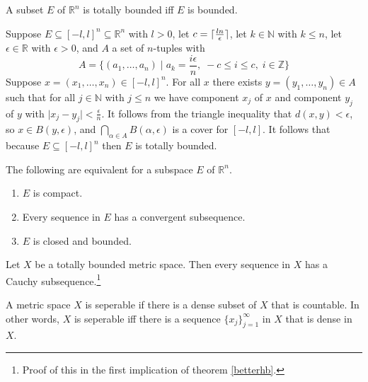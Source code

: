 \documentclass[nobib,notoc]{tufte-handout}
\begin{document}
\begin{lem}
	A subset \(E\) of \(\mathbb{R}^n\) is totally bounded iff \(E\) is bounded.
	\begin{IEEEproof}
	Suppose \(E\subseteq [-l,l]^n\subseteq\mathbb{R}^n\) with \(l>0\), let \(c=\lceil\frac{ln}{\epsilon}\rceil\), let \(k\in\mathbb{N}\) with \(k\leq n\), let \(\epsilon\in\mathbb{R}\) with \(\epsilon>0\), and \(A\) a set of \(n\)-tuples with
	\begin{equation*}
			  A=\{(a_1,\ldots,a_n)\;| \;a_k=\frac{i\epsilon}{n},\; -c\leq i\leq c,\;i\in\mathbb{Z}\}
	\end{equation*}
		Suppose \(x=(x_1,\ldots,x_n)\in[-l,l]^n\). For all \(x\) there exists \(y=(y_1,\ldots,y_n)\in A\) such that for all \(j\in\mathbb{N}\) with \(j\leq n\) we have component \(x_j\) of \(x\) and component \(y_j\) of \(y\) with \(\lvert x_j-y_j\rvert<\frac{\epsilon}{n}\). It follows from the triangle inequality that \(d(x,y)<\epsilon\), so \(x\in B(y,\epsilon)\), and \(\bigcap_{\alpha\in A}B(\alpha,\epsilon)\) is a cover for \([-l,l]\). It follows that because \(E\subseteq [-l,l]^n\) then \(E\) is totally bounded.
	\end{IEEEproof}
\end{lem}
\begin{thm}
	The following are equivalent for a subspace \(E\) of \(\mathbb{R}^n\).
	\begin{enumerate}
		\item \(E\) is compact.
		\item Every sequence in \(E\) has a convergent subsequence.
		\item \(E\) is closed and bounded.
	\end{enumerate}
\end{thm}
\begin{thm}
	\label{tbcontcauchy}
	Let \(X\) be a totally bounded metric space. Then every sequence in \(X\) has a Cauchy subsequence.\footnote{Proof of this in the first implication of theorem \ref{betterhb}.}
\end{thm}
\begin{defi}[Seperability]
	A metric space \(X\) is seperable if there is a dense subset of \(X\) that is countable. In other words, \(X\) is seperable iff there is a sequence \(\{x_j\}_{j=1}^{\infty}\) in \(X\) that is dense in \(X\).
\end{defi}
\end{document}
